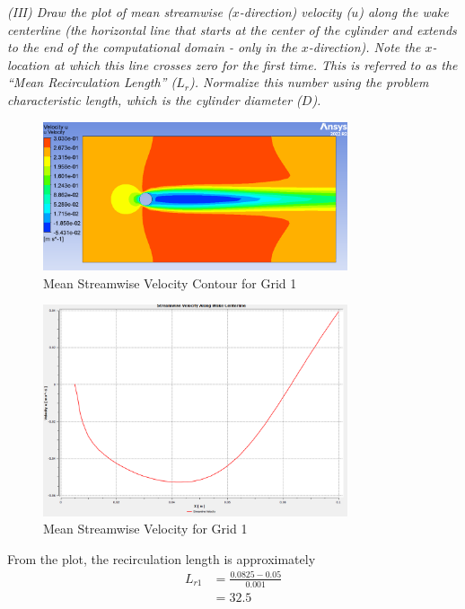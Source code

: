 \textit{(III) Draw the plot of mean streamwise ($x$-direction) velocity ($u$) along the wake centerline (the horizontal line that starts at the center of the cylinder and extends to the end of the computational domain - only in the $x$-direction). Note the $x$-location at which this line crosses zero for the first time. This is referred to as the “Mean Recirculation Length” ($L_r$). Normalize this number using the problem characteristic length, which is the cylinder diameter ($D$).}
\begin{figure}[H]
    \centering
    \includegraphics[width=0.8\textwidth]{Questions/Figures/u velocity contour grid 1.png}
    \caption{Mean Streamwise Velocity Contour for Grid 1}
\end{figure}
\begin{figure}[H]
    \centering
    \includegraphics[width=0.8\textwidth]{Questions/Figures/plot with grid 1.png}
    \caption{Mean Streamwise Velocity for Grid 1}
\end{figure}
From the plot, the recirculation length is approximately
\begin{align*}
    L_{r1} &= \frac{0.0825 - 0.05}{0.001} \\
    &=\boxed{32.5}
\end{align*}

